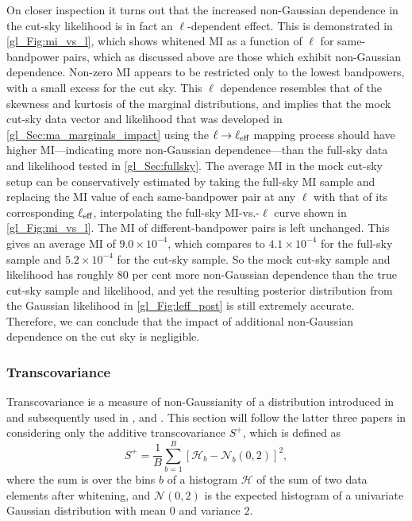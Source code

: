 On closer inspection it turns out that the increased non-Gaussian dependence in the cut-sky likelihood is in fact an $\ell$-dependent effect. This is demonstrated in \autoref{gl_Fig:mi_vs_l}, which shows whitened MI as a function of $\ell$ for same-bandpower pairs, which as discussed above are those which exhibit non-Gaussian dependence. Non-zero MI appears to be restricted only to the lowest bandpowers, with a small excess for the cut sky. This $\ell$ dependence resembles that of the skewness and kurtosis of the marginal distributions, and implies that the mock cut-sky data vector and likelihood that was developed in \autoref{gl_Sec:ma_marginals_impact} using the $\ell \rightarrow \ell_\text{eff}$ mapping process should have higher MI---indicating more non-Gaussian dependence---than the full-sky data and likelihood tested in \autoref{gl_Sec:fullsky}.
The average MI in the mock cut-sky setup can be conservatively estimated by taking the full-sky MI sample and replacing the MI value of each same-bandpower pair at any $\ell$ with that of its corresponding $\ell_\text{eff}$, interpolating the full-sky MI-vs.-$\ell$ curve shown in \autoref{gl_Fig:mi_vs_l}. The MI of different-bandpower pairs is left unchanged. This gives an average MI of $9.0 \times 10^{-4}$, which compares to $4.1 \times 10^{-4}$ for the full-sky sample and $5.2 \times 10^{-4}$ for the cut-sky sample. So the mock cut-sky sample and likelihood has roughly 80 per cent more non-Gaussian dependence than the true cut-sky sample and likelihood, and yet the resulting posterior distribution from the Gaussian likelihood in \autoref{gl_Fig:leff_post} is still extremely accurate. Therefore, we can conclude that the impact of additional non-Gaussian dependence on the cut sky is negligible.

\subsubsection{Transcovariance}
\label{gl_Sec:transcov}

Transcovariance is a measure of non-Gaussianity of a distribution introduced in \citet{Sellentin2018} and subsequently used in \citet{Sellentin2018a}, \citet{Louca2020} and \citet{DiazRivero2020}. This section will follow the latter three papers in considering only the additive transcovariance $S^+$, which is defined as
\begin{equation}
S^+ = \frac{1}{B} \sum_{b = 1}^B
\left[ \mathcal{H}_b - \mathcal{N}_b \left(0, 2 \right) \right]^2,
\end{equation}
where the sum is over the bins $b$ of a histogram $\mathcal{H}$ of the sum of two data elements after whitening, and $\mathcal{N} \left(0, 2 \right)$ is the expected histogram of a univariate Gaussian distribution with mean $0$ and variance $2$.

